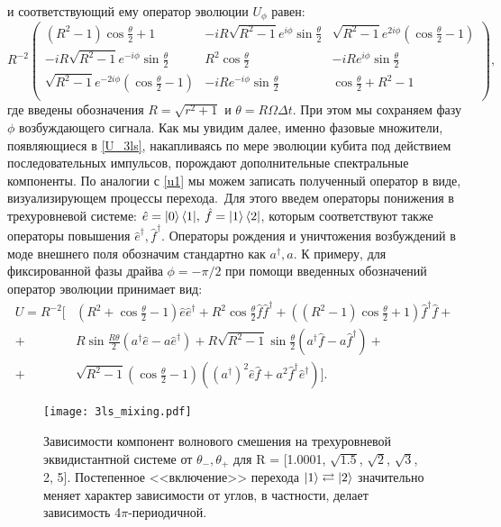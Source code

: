 и соответствующий ему оператор эволюции $U_\phi$ равен:
\begin{equation} 
 R^{-2}
 \left(
 \begin{array}{ccc}
 \left(R^2-1\right) \cos \frac{\theta }{2}+1 & -i R \sqrt{R^2-1} e^{i \phi } \sin \frac{\theta }{2} & \sqrt{R^2-1} e^{2 i \phi } \left(\cos
 \frac{\theta }{2}-1\right) \\
 -i R \sqrt{R^2-1} e^{-i \phi } \sin \frac{\theta }{2} & R^2 \cos \frac{\theta }{2} & -i R e^{i \phi } \sin \frac{\theta }{2}
 \\
 \sqrt{R^2-1} e^{-2 i \phi } \left(\cos \frac{\theta }{2}-1\right) & -i R e^{-i \phi } \sin \frac{\theta }{2} & \cos \frac{\theta
 }{2}+R^2-1 \\
 \end{array}
 \right),
 \label{U_3ls}
\end{equation}
где введены обозначения $R = \sqrt{r^2 + 1}$ и $\theta = R\Omega \Delta t$. При этом мы сохраняем фазу $\phi$  возбуждающего сигнала. Как мы увидим далее, именно фазовые множители, появляющиеся в \eqref{U_3ls}, накапливаясь по мере эволюции кубита под действием последовательных импульсов, порождают дополнительные спектральные компоненты.
По аналогии с \eqref{u1} мы можем записать полученный оператор в виде, визуализирующем процессы перехода.~Для этого введем операторы понижения в трехуровневой системе: $\hat{e} = \ket{0}\bra{1}\!,\:\hat{f} = \ket{1}\bra{2}$, которым соответствуют также операторы повышения $\hat{e}^\dag, \hat{f}^\dag$. Операторы рождения и уничтожения возбуждений в моде внешнего поля обозначим стандартно как $a^\dag, a$.
К примеру, для фиксированной фазы драйва $\phi = -\pi/2$ при помощи введенных обозначений оператор эволюции принимает вид:
\begin{equation}
	\begin{split}
	U = R^{-2}\Big[
	&\left(R^2+\cos \frac{\theta }{2}-1\right)\hat{e}\hat{e}^\dag + R^2 \cos \frac{\theta }{2} \hat{f}\hat{f}^\dag + \left(\left(R^2-1\right) \cos\frac{\theta }{2}+1\right) \hat{f}^\dag\hat{f} + \\
	+ &R \sin \frac{R \theta }{2} \left(a^\dag \hat{e}-a\hat{e}^\dag\right) + R \sqrt{R^2-1} \sin \frac{\theta }{2}\left(a^\dag \hat{f}-a\hat{f}^\dag\right) + \\
	+ &\sqrt{R^2-1} \left(\cos \frac{\theta }{2}-1\right)\left((a^\dagger)^2\hat{e}\hat{f} + a^2\hat{f}^\dag \hat{e}^\dag\right)
	\Big].
	\end{split}
\end{equation}
\begin{figure}[h]
	\centering
	\texttt{[image: 3ls\_mixing.pdf]}
	\caption[Квантовое волновое смешение на трехуровневой эквидистантной системе] {Зависимости компонент волнового смешения на трехуровневой эквидистантной системе от $\theta_-, \theta_+$ для R = [1.0001, $\sqrt{1.5}$, $\sqrt{2}$, $\sqrt{3}$, 2, 5]. Постепенное <<включение>> перехода $\ket{1}\rightleftarrows\ket{2}$ значительно меняет характер зависимости от углов, в частности, делает зависимость 4$\pi$-периодичной. }
	\label{fig:maps_3ls}
\end{figure}

